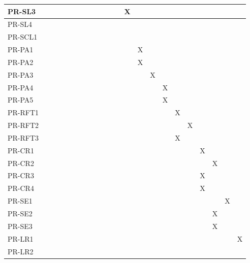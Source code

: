 \documentclass[12pt, titlepage]{article}
\begin{document}
\begin{table}[H]
{\begin{tabular}{|l|l|l|l|l|l|l|l|l|l|l|l|l|l|l|l|l|l|}
      PR-SL3 & ~ & ~ & ~ & ~ & ~ & ~ & ~ & X & ~ & ~ & ~ & ~ & ~ & ~ & ~ & ~ & ~ \\ \hline
      PR-SL4 & ~ & ~ & ~ & ~ & ~ & ~ & ~ & ~ & ~ & ~ & ~ & ~ & ~ & ~ & ~ & ~ & ~ \\ \hline
      PR-SCL1 & ~ & ~ & ~ & ~ & ~ & ~ & ~ & ~ & ~ & ~ & ~ & ~ & ~ & ~ & ~ & ~ & ~ \\ \hline
      PR-PA1 & ~ & ~ & ~ & ~ & ~ & ~ & ~ & ~ & X & ~ & ~ & ~ & ~ & ~ & ~ & ~ & ~ \\ \hline
      PR-PA2 & ~ & ~ & ~ & ~ & ~ & ~ & ~ & ~ & X & ~ & ~ & ~ & ~ & ~ & ~ & ~ & ~ \\ \hline
      PR-PA3 & ~ & ~ & ~ & ~ & ~ & ~ & ~ & ~ & ~ & X & ~ & ~ & ~ & ~ & ~ & ~ & ~ \\ \hline
      PR-PA4 & ~ & ~ & ~ & ~ & ~ & ~ & ~ & ~ & ~ & ~ & X & ~ & ~ & ~ & ~ & ~ & ~ \\ \hline
      PR-PA5 & ~ & ~ & ~ & ~ & ~ & ~ & ~ & ~ & ~ & ~ & X & ~ & ~ & ~ & ~ & ~ & ~ \\ \hline
      PR-RFT1 & ~ & ~ & ~ & ~ & ~ & ~ & ~ & ~ & ~ & ~ & ~ & X & ~ & ~ & ~ & ~ & ~ \\ \hline
      PR-RFT2 & ~ & ~ & ~ & ~ & ~ & ~ & ~ & ~ & ~ & ~ & ~ & ~ & X & ~ & ~ & ~ & ~ \\ \hline
      PR-RFT3 & ~ & ~ & ~ & ~ & ~ & ~ & ~ & ~ & ~ & ~ & ~ & X & ~ & ~ & ~ & ~ & ~ \\ \hline
      PR-CR1 & ~ & ~ & ~ & ~ & ~ & ~ & ~ & ~ & ~ & ~ & ~ & ~ & ~ & X & ~ & ~ & ~ \\ \hline
      PR-CR2 & ~ & ~ & ~ & ~ & ~ & ~ & ~ & ~ & ~ & ~ & ~ & ~ & ~ & ~ & X & ~ & ~ \\ \hline
      PR-CR3 & ~ & ~ & ~ & ~ & ~ & ~ & ~ & ~ & ~ & ~ & ~ & ~ & ~ & X & ~ & ~ & ~ \\ \hline
      PR-CR4 & ~ & ~ & ~ & ~ & ~ & ~ & ~ & ~ & ~ & ~ & ~ & ~ & ~ & X & ~ & ~ & ~ \\ \hline
      PR-SE1 & ~ & ~ & ~ & ~ & ~ & ~ & ~ & ~ & ~ & ~ & ~ & ~ & ~ & ~ & ~ & X & ~ \\ \hline
      PR-SE2 & ~ & ~ & ~ & ~ & ~ & ~ & ~ & ~ & ~ & ~ & ~ & ~ & ~ & ~ & X & ~ & ~ \\ \hline
      PR-SE3 & ~ & ~ & ~ & ~ & ~ & ~ & ~ & ~ & ~ & ~ & ~ & ~ & ~ & ~ & X & ~ & ~ \\ \hline
      PR-LR1 & ~ & ~ & ~ & ~ & ~ & ~ & ~ & ~ & ~ & ~ & ~ & ~ & ~ & ~ & ~ & ~ & X \\ \hline
      PR-LR2 & ~ & ~ & ~ & ~ & ~ & ~ & ~ & ~ & ~ & ~ & ~ & ~ & ~ & ~ & ~ & ~ & ~ \\ \hline

\end{tabular}}
\end{table}
\end{document}
